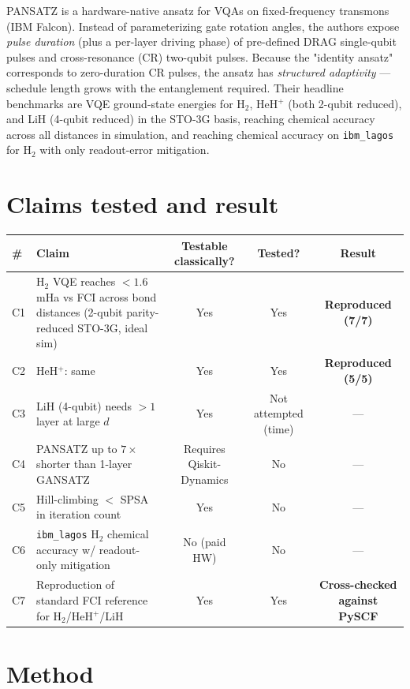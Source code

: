 \documentclass[11pt,letterpaper]{article}
\begin{document}
PANSATZ is a hardware-native ansatz for VQAs on fixed-frequency transmons (IBM Falcon). Instead of parameterizing gate rotation angles, the authors expose \emph{pulse duration} (plus a per-layer driving phase) of pre-defined DRAG single-qubit pulses and cross-resonance (CR) two-qubit pulses. Because the "identity ansatz" corresponds to zero-duration CR pulses, the ansatz has \emph{structured adaptivity} --- schedule length grows with the entanglement required. Their headline benchmarks are VQE ground-state energies for H$_2$, HeH$^+$ (both 2-qubit reduced), and LiH (4-qubit reduced) in the STO-3G basis, reaching chemical accuracy across all distances in simulation, and reaching chemical accuracy on \texttt{ibm\_lagos} for H$_2$ with only readout-error mitigation.

\section{Claims tested and result}

\begin{table}[h!]
\centering\small
\begin{tabular}{@{}lp{6cm}ccc@{}}
\toprule
\# & Claim & Testable classically? & Tested? & Result \\
\midrule
C1 & H$_2$ VQE reaches $<1.6$\,mHa vs FCI across bond distances (2-qubit parity-reduced STO-3G, ideal sim) & Yes & Yes & \textbf{Reproduced (7/7)} \\
C2 & HeH$^+$: same & Yes & Yes & \textbf{Reproduced (5/5)} \\
C3 & LiH (4-qubit) needs $>1$ layer at large $d$ & Yes & Not attempted (time) & --- \\
C4 & PANSATZ up to $7\times$ shorter than 1-layer GANSATZ & Requires Qiskit-Dynamics & No & --- \\
C5 & Hill-climbing $<$ SPSA in iteration count & Yes & No & --- \\
C6 & \texttt{ibm\_lagos} H$_2$ chemical accuracy w/ readout-only mitigation & No (paid HW) & No & --- \\
C7 & Reproduction of standard FCI reference for H$_2$/HeH$^+$/LiH & Yes & Yes & \textbf{Cross-checked against PySCF} \\
\bottomrule
\end{tabular}
\end{table}

\section{Method}
\end{document}
